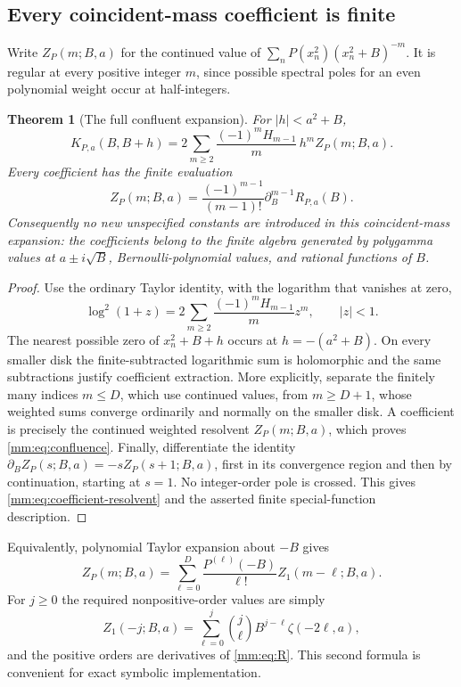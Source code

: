 \documentclass[11pt,a4paper]{article}
\numberwithin{equation}{section}
\newtheorem{theorem}{Theorem}[section]
\theoremstyle{definition}
\theoremstyle{remark}
\begin{document}
\subsection{Every coincident-mass coefficient is finite}

Write $Z_{P}(m;B,a)$ for the continued value of
$\sum_nP(x_n^2)(x_n^2+B)^{-m}$.  It is regular at every positive
integer $m$, since possible spectral poles for an even polynomial
weight occur at half-integers.

\begin{theorem}[The full confluent expansion]
\label{mm:thm:confluence}
For $|h|<a^2+B$,
\begin{equation}\label{mm:eq:confluence}
 \boxed{\displaystyle
 K_{P,a}(B,B+h)=2\sum_{m\ge2}
       \frac{(-1)^mH_{m-1}}m\,h^m Z_{P}(m;B,a).}
\end{equation}
Every coefficient has the finite evaluation
\begin{equation}\label{mm:eq:coefficient-resolvent}
 Z_{P}(m;B,a)=\frac{(-1)^{m-1}}{(m-1)!}
                            \partial_B^{m-1}R_{P,a}(B).
\end{equation}
Consequently no new unspecified constants are introduced in this
coincident-mass expansion: the coefficients belong to the finite
algebra generated by polygamma values at $a\pm i\sqrt B$,
Bernoulli-polynomial values, and rational functions of $B$.
\end{theorem}
\begin{proof}
Use the ordinary Taylor identity, with the logarithm that vanishes at zero,
\[
 \log^2(1+z)=2\sum_{m\ge2}\frac{(-1)^mH_{m-1}}m z^m,
 \qquad |z|<1.
\]
The nearest possible zero of $x_n^2+B+h$ occurs at
$h=-(a^2+B)$.  On every smaller disk the finite-subtracted logarithmic
sum is holomorphic and the same subtractions justify coefficient
extraction.  More explicitly, separate the finitely many indices
$m\le D$, which use continued values, from $m\ge D+1$,
whose weighted sums converge ordinarily and normally on the smaller
disk.  A coefficient is precisely the continued weighted
resolvent $Z_P(m;B,a)$, which proves \eqref{mm:eq:confluence}.
Finally, differentiate the identity
$\partial_B Z_P(s;B,a)=-sZ_P(s+1;B,a)$, first in its convergence
region and then by continuation, starting at $s=1$.  No integer-order
pole is crossed.  This gives \eqref{mm:eq:coefficient-resolvent} and
the asserted finite special-function description.
\end{proof}

Equivalently, polynomial Taylor expansion about $-B$ gives
\[
 Z_P(m;B,a)=\sum_{\ell=0}^{D}\frac{P^{(\ell)}(-B)}{\ell!}
                          Z_1(m-\ell;B,a).
\]
For $j\ge0$ the required nonpositive-order values are simply
\[
 Z_1(-j;B,a)=\sum_{\ell=0}^{j}\binom j\ell
                              B^{j-\ell}\zeta(-2\ell,a),
\]
and the positive orders are derivatives of \eqref{mm:eq:R}.
This second formula is convenient for exact symbolic implementation.
\end{document}
